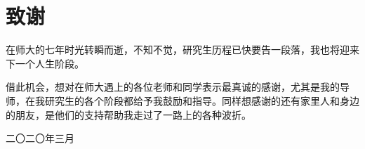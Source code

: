 
\chapter*{ 致\qquad 谢}


在师大的七年时光转瞬而逝，不知不觉，研究生历程已快要告一段落，我也将迎来下一个人生阶段。

借此机会，想对在师大遇上的各位老师和同学表示最真诚的感谢，尤其是我的导师，在我研究生的各个阶段都给予我鼓励和指导。同样想感谢的还有家里人和身边的朋友，是他们的支持帮助我走过了一路上的各种波折。


\vspace{0.2cm} \hspace{11.5cm}

\hspace{10.6cm}  二〇二〇年三月
